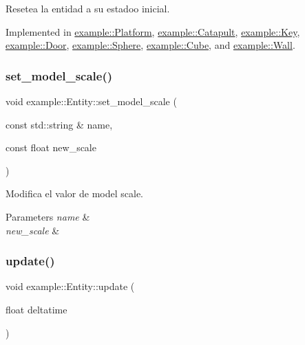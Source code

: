 Resetea la entidad a su estadoo inicial. 



Implemented in \mbox{\hyperlink{classexample_1_1_platform_ae38e7d4e1870a52e5b070417c5a64cb4}{example\+::\+Platform}}, \mbox{\hyperlink{classexample_1_1_catapult_acbef58b1295f5ddfedd45d92bd6fbfcf}{example\+::\+Catapult}}, \mbox{\hyperlink{classexample_1_1_key_aff9c8392d5275a833d005673b0273785}{example\+::\+Key}}, \mbox{\hyperlink{classexample_1_1_door_a1743bad7a1a941423b0567a1cdc26c21}{example\+::\+Door}}, \mbox{\hyperlink{classexample_1_1_sphere_ae76b4b7d9d5a4f14fe0308bf576a5a62}{example\+::\+Sphere}}, \mbox{\hyperlink{classexample_1_1_cube_ac584c2440bddb8afdf9d2adf666ccd59}{example\+::\+Cube}}, and \mbox{\hyperlink{classexample_1_1_wall_a41f0246b24c58e2f7adf6be5284dccd4}{example\+::\+Wall}}.

\mbox{\label{classexample_1_1_entity_ad9d57f2c8d41b5b977a79a0b8d24d859}} 
\subsubsection{\texorpdfstring{set\_model\_scale()}{set\_model\_scale()}}
{\footnotesize\ttfamily void example\+::\+Entity\+::set\+\_\+model\+\_\+scale (\begin{DoxyParamCaption}\item[{const std\+::string \&}]{name,  }\item[{const float}]{new\+\_\+scale }\end{DoxyParamCaption})\hspace{0.3cm}{\ttfamily [inline]}}



Modifica el valor de model scale. 


\begin{DoxyParams}{Parameters}
{\em name} & \\
\hline
{\em new\+\_\+scale} & \\
\hline
\end{DoxyParams}
\mbox{\label{classexample_1_1_entity_a1f987399c6c2f5e83b2d245d81cc3b7e}} 
\subsubsection{\texorpdfstring{update()}{update()}}
{\footnotesize\ttfamily void example\+::\+Entity\+::update (\begin{DoxyParamCaption}\item[{float}]{deltatime }\end{DoxyParamCaption})\hspace{0.3cm}{\ttfamily [virtual]}}



